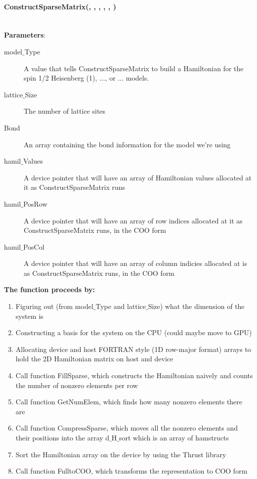 \documentclass{article}
\begin{document}
\paragraph{\host \int ConstructSparseMatrix(\int, \int, \typelongptr, \cuDoubleComplex, \typelongptr, \typelongptr) \\ \\}
\noindent\textbf{Parameters}:
\begin{description}
\item[\int model$\_$Type] A value that tells ConstructSparseMatrix to build a Hamiltonian for the spin 1/2 Heisenberg (1), ..., or ... models.
\item[\int lattice$\_$Size] The number of lattice sites
\item[\typelongptr Bond] An array containing the bond information for the model we're using 
\item[\cuDoubleComplex hamil$\_$Values] A device pointer that will have an array of Hamiltonian values allocated at it as ConstructSparseMatrix runs
\item[\typelongptr hamil$\_$PosRow] A device pointer that will have an array of row indices allocated at it as ConstructSparseMatrix runs, in the COO form
\item[\typelongptr hamil$\_$PosCol] A device pointer that will have an array of column indicies allocated at is as ConstructSparseMatrix runs, in the COO form
\end{description}

\noindent\textbf{The function proceeds by:}
\begin{enumerate}
\item{Figuring out (from model$\_$Type and lattice$\_$Size) what the dimension of the system is}
\item{Constructing a basis for the system on the CPU (could maybe move to GPU)}
\item{Allocating device and host FORTRAN style (1D row-major format) arrays to hold the 2D Hamiltonian matrix on host and device}
\item{Call function FillSparse, which constructs the Hamiltonian naively and counts the number of nonzero elements per row}
\item{Call function GetNumElem, which finds how many nonzero elements there are}
\item{Call function CompressSparse, which moves all the nonzero elements and their positions into the array d$\_$H$\_$sort which is an array of hamstructs}
\item{Sort the Hamiltonian array on the device by using the Thrust library}
\item{Call function FulltoCOO, which transforms the representation to COO form}
\end{enumerate}
\end{document}
